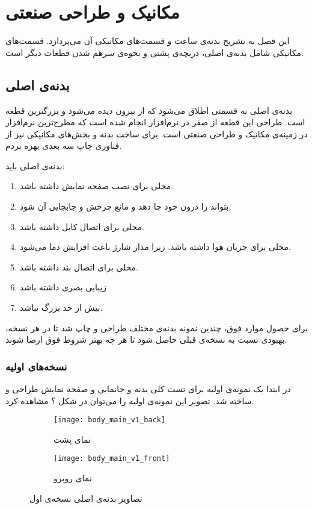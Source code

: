 \chapter{مکانیک و طراحی صنعتی}

این فصل به تشریح بدنه‌ی ساعت و قسمت‌های مکانیکی آن می‌پردازد. قسمت‌های مکانیکی شامل بدنه‌ی اصلی، دریچه‌ی پشتی و نحوه‌ی سرهم شدن قطعات دیگر است.
\section{بدنه‌ی اصلی}
بدنه‌ی اصلی به قسمتی اطلاق می‌شود که از بیرون دیده می‌شود و بزرگترین قطعه است. طراحی این قطعه از صفر در نرم‌افزار  انجام شده است که مطرح‌ترین نرم‌افزار در زمینه‌ی مکانیک و طراحی صنعتی است. برای ساخت بدنه و بخش‌های مکانیکی نیز از فناوری چاپ سه بعدی بهره بردم.

بدنه‌ی اصلی باید:
\begin{multicols}{2}
\begin{enumerate}
	\item محلی برای نصب صفحه نمایش داشته باشد.
	\item  بتواند \pcbf را درون خود جا دهد و مانع چرخش و جابجایی آن شود.
	\item محلی برای اتصال کابل  داشته باشد.
	\item محلی برای جریان هوا داشته باشد. زیرا مدار شارژ باعث افزایش دما می‌شود.
	\item محلی برای اتصال بند داشته باشد.
	\item زیبایی بصری داشته باشد
	\item بیش از حد بزرگ نباشد.
\end{enumerate}
\end{multicols}

برای حصول موارد فوق، چندین نمونه بدنه‌ی مختلف طراحی و چاپ شد تا در هر نسخه، بهبودی نسبت به نسخه‌ی قبلی حاصل شود تا هر چه بهتر شروط فوق ارضا شوند.

\subsection{نسخه‌های اولیه}

در ابتدا یک نمونه‌ی اولیه برای تست کلی بدنه و جانمایی \pcbf و صفحه نمایش طراحی و ساخته شد. تصویر این نمونه‌ی اولیه را می‌توان در شکل ؟ مشاهده کرد.

\begin{figure}[h]
	\centering
	\begin{subfigure}{0.44\textwidth}
		\centering
		\texttt{[image: body\_main\_v1\_back]}
		\caption{نمای پشت}
	\end{subfigure}
	\begin{subfigure}{0.44\textwidth}
		\centering
		\texttt{[image: body\_main\_v1\_front]}
		\caption{نمای روبرو}
	\end{subfigure}
	\caption{تصاویر بدنه‌ی اصلی نسخه‌ی اول}
	\label{fig:body-v1}
\end{figure}

